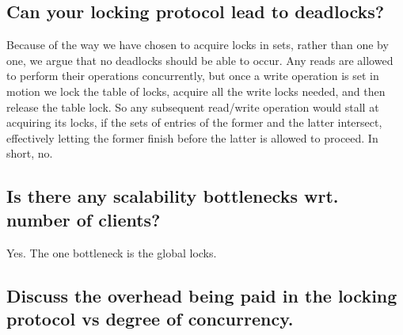 \subsection{Can your locking protocol lead to deadlocks?}
Because of the way we have chosen to acquire locks in sets, rather than one by
one, we argue that no deadlocks should be able to occur. Any reads are allowed
to perform their operations concurrently, but once a write operation is set in
motion we lock the table of locks, acquire all the write locks needed, and then
release the table lock. So any subsequent read/write operation would stall at
acquiring its locks, if the sets of entries of the former and the latter
intersect, effectively letting the former finish before the latter is allowed
to proceed. In short, no.

\subsection{Is there any scalability bottlenecks wrt. number of clients?}
Yes. The one bottleneck is the global locks.

\subsection{Discuss the overhead being paid in the locking protocol vs degree of concurrency.}


